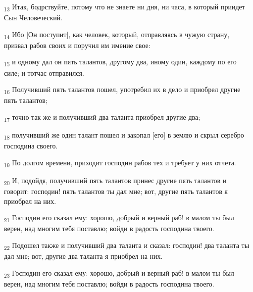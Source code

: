 \begin{tcolorbox}
\textsubscript{13} Итак, бодрствуйте, потому что не знаете ни дня, ни часа, в который приидет Сын Человеческий.
\end{tcolorbox}
\begin{tcolorbox}
\textsubscript{14} Ибо [Он поступит], как человек, который, отправляясь в чужую страну, призвал рабов своих и поручил им имение свое:
\end{tcolorbox}
\begin{tcolorbox}
\textsubscript{15} и одному дал он пять талантов, другому два, иному один, каждому по его силе; и тотчас отправился.
\end{tcolorbox}
\begin{tcolorbox}
\textsubscript{16} Получивший пять талантов пошел, употребил их в дело и приобрел другие пять талантов;
\end{tcolorbox}
\begin{tcolorbox}
\textsubscript{17} точно так же и получивший два таланта приобрел другие два;
\end{tcolorbox}
\begin{tcolorbox}
\textsubscript{18} получивший же один талант пошел и закопал [его] в землю и скрыл серебро господина своего.
\end{tcolorbox}
\begin{tcolorbox}
\textsubscript{19} По долгом времени, приходит господин рабов тех и требует у них отчета.
\end{tcolorbox}
\begin{tcolorbox}
\textsubscript{20} И, подойдя, получивший пять талантов принес другие пять талантов и говорит: господин! пять талантов ты дал мне; вот, другие пять талантов я приобрел на них.
\end{tcolorbox}
\begin{tcolorbox}
\textsubscript{21} Господин его сказал ему: хорошо, добрый и верный раб! в малом ты был верен, над многим тебя поставлю; войди в радость господина твоего.
\end{tcolorbox}
\begin{tcolorbox}
\textsubscript{22} Подошел также и получивший два таланта и сказал: господин! два таланта ты дал мне; вот, другие два таланта я приобрел на них.
\end{tcolorbox}
\begin{tcolorbox}
\textsubscript{23} Господин его сказал ему: хорошо, добрый и верный раб! в малом ты был верен, над многим тебя поставлю; войди в радость господина твоего.
\end{tcolorbox}
